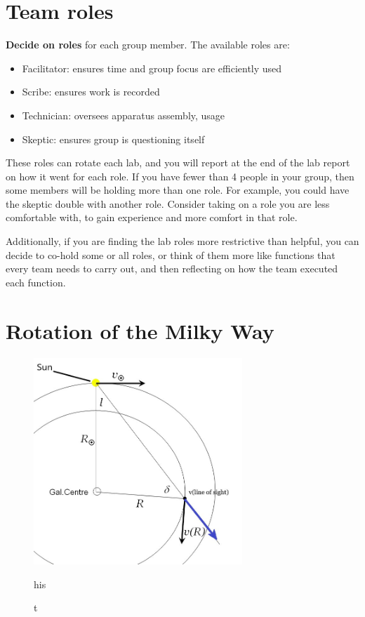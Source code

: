 \section{Team roles}

\textbf{Decide on roles} for each group member. The available roles are:

\begin{itemize}
	\item Facilitator: ensures time and group focus are efficiently used
	\item Scribe: ensures work is recorded
	\item Technician: oversees apparatus assembly, usage
	\item Skeptic: ensures group is questioning itself
\end{itemize}

These roles can rotate each lab, and you will report at the end of the lab report on how it went for each role. If you have fewer than 4 people in your group, then some members will be holding more than one role. For example, you could have the skeptic double with another role. Consider taking on a role you are less comfortable with, to gain experience and more comfort in that role.

Additionally, if you are finding the lab roles more restrictive than helpful, you can decide to co-hold some or all roles, or think of them more like functions that every team needs to carry out, and then reflecting on how the team executed each function.

\section{Rotation of the Milky Way}

\begin{figure}
	\centering
	\includegraphics[width = 0.7\textwidth]{srt-galaxy-rotation/geometry_edit}
	\caption this
	\label{sgr:fig:gal-geom}
\end{figure}


